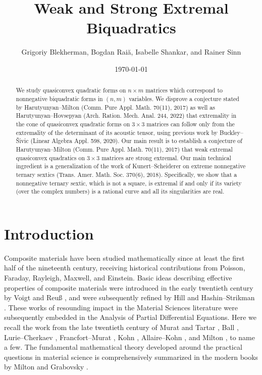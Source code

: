 \documentclass[a4paper]{article}
\title{Weak and Strong Extremal Biquadratics}
\author{Grigoriy Blekherman, Bogdan Rai\cb{t}\u{a}, Isabelle Shankar, and Rainer Sinn}
\date{\today}
\numberwithin{equation}{section}
\theoremstyle{definition}
\theoremstyle{remark}
\begin{document}
\maketitle
\begin{abstract}
\noindent 
We study quasiconvex quadratic forms on $n \times m$ matrices which correspond to nonnegative biquadratic forms in $(n,m)$ variables. We disprove a conjecture stated by Harutyunyan--Milton (Comm. Pure Appl. Math. 70(11), 2017) as well as Harutyunyan--Hovsepyan (Arch. Ration. Mech. Anal. 244, 2022) that extremality in the cone of quasiconvex quadratic forms on $3\times 3$ matrices can follow only from the extremality of the determinant of its acoustic tensor, using previous work  by Buckley--\v{S}ivic (Linear Algebra Appl. 598, 2020).
Our main result is to establish a conjecture of Harutyunyan--Milton (Comm. Pure Appl. Math. 70(11), 2017) that weak extremal quasiconvex quadratics on $3 \times 3$ matrices are strong extremal.  
Our main technical ingredient is a generalization of the work of Kunert--Scheiderer on extreme nonnegative ternary sextics (Trans. Amer. Math. Soc. 370(6), 2018).  Specifically, we show that a nonnegative ternary sextic, which is not a square, is extremal if and only if its  variety (over the complex numbers) is a rational curve and all its singularities are real.
\end{abstract}

\section{Introduction}
Composite materials have been studied mathematically since at least the first half of the nineteenth century, receiving historical contributions from Poisson, Faraday, Rayleigh, Maxwell, and Einstein. Basic ideas describing effective properties of composite materials were introduced in the early twentieth century by Voigt \cite{Voigt} and Reu{\ss} \cite{Reuss}, and were subsequently refined by Hill \cite{hill1952elastic} and Hashin--Strikman \cite{hashin1962variational,hashin1963variational}. These works of resounding impact in the Material Sciences literature were subsequently embedded in the Analysis of Partial Differential Equations. Here we recall the work from the late twentieth century of Murat and Tartar \cite{MuratTartar,tartar1979,tartar1985}, Ball \cite{ball77}, Lurie--Cherkaev \cite{lurie1984exact}, Francfort--Murat \cite{francfort1986homogenization}, Kohn \cite{Kohn}, Allaire--Kohn \cite{allaire1993optimal,allaire1994optimal}, and Milton \cite{MiltonCPAM}, to name a few. The fundamental mathematical theory developed around the practical questions in material science is comprehensively summarized in the modern books by Milton \cite{MiltonBook} and Grabovsky \cite{GrabovskyBook}.
\end{document}
